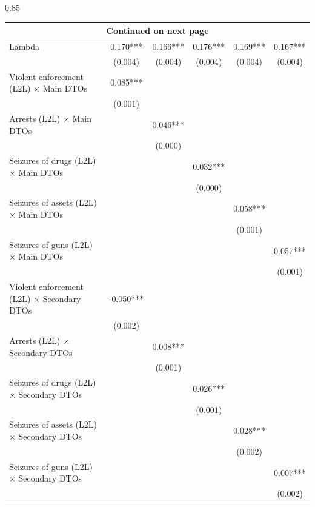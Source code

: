 \documentclass[12pt,letterpaper]{article}
\begin{document}
\begin{landscape}
\begin{center}
\begin{spacing}{0.85}
\begin{longtable}{lccccc}
\hline \multicolumn{6}{c}{{Continued on next page}} \\ \hline
\endfoot

\hline \hline
\endlastfoot
                
Lambda  & 0.170*** & 0.166*** & 0.176*** & 0.169*** & 0.167*** \\
 & (0.004)  & (0.004)  & (0.004)  & (0.004)  & (0.004)  \\
      
Violent enforcement (L2L) $\times$ Main DTOs & 0.085*** &   &   &   &   \\
 & (0.001)  &   &   &   &   \\
Arrests (L2L) $\times$ Main DTOs &   & 0.046*** &   &   &   \\
 &   & (0.000)  &   &   &   \\
Seizures of drugs (L2L) $\times$ Main DTOs &   &   & 0.032*** &   &   \\
 &   &   & (0.000)  &   &   \\
Seizures of assets (L2L) $\times$ Main DTOs &   &   &   & 0.058*** &   \\
 &   &   &   & (0.001)  &   \\
Seizures of guns (L2L) $\times$ Main DTOs &   &   &   &   & 0.057*** \\
 &   &   &   &   & (0.001)  \\

Violent enforcement (L2L) $\times$ Secondary DTOs & -0.050*** &   &   &   &   \\
 & (0.002)  &   &   &   &   \\
Arrests (L2L) $\times$ Secondary DTOs &   & 0.008*** &   &   &   \\
 &   & (0.001)  &   &   &   \\
Seizures of drugs (L2L) $\times$ Secondary DTOs &   &   & 0.026*** &   &   \\
 &   &   & (0.001)  &   &   \\
Seizures of assets (L2L) $\times$ Secondary DTOs &   &   &   & 0.028*** &   \\
 &   &   &   & (0.002)  &   \\
Seizures of guns (L2L) $\times$ Secondary DTOs &   &   &   &   & 0.007*** \\
 &   &   &   &   & (0.002)  \\
                

\end{longtable}
\end{spacing}
\end{center}
\end{landscape}
\end{document}
